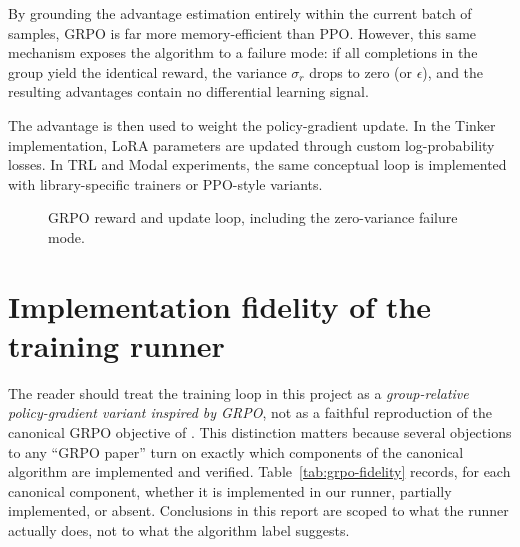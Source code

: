 \documentclass[12pt,a4paper]{report}
\newcommand{\fitdiagram}[1]{\resizebox{\textwidth}{!}{}}
\begin{document}
By grounding the advantage estimation entirely within the current batch of samples, GRPO is far more memory-efficient than PPO. However, this same mechanism exposes the algorithm to a failure mode: if all completions in the group yield the identical reward, the variance $\sigma_r$ drops to zero (or $\epsilon$), and the resulting advantages contain no differential learning signal.

The advantage is then used to weight the policy-gradient update. In the Tinker implementation, LoRA parameters are updated through custom log-probability losses. In TRL and Modal experiments, the same conceptual loop is implemented with library-specific trainers or PPO-style variants.

\begin{figure}[ht]
  \centering
  \fitdiagram{../../../platform_tinker/reports/final/tikz/grpo_loop.tex}
  \caption{GRPO reward and update loop, including the zero-variance failure mode.}
  \label{fig:grpo-loop}
\end{figure}

\section{Implementation fidelity of the training runner}
\label{sec:grpo-fidelity}

The reader should treat the training loop in this project as a \emph{group-relative policy-gradient variant inspired by GRPO}, not as a faithful reproduction of the canonical GRPO objective of \citet{shao2024deepseekmath}. This distinction matters because several objections to any ``GRPO paper'' turn on exactly which components of the canonical algorithm are implemented and verified. Table~\ref{tab:grpo-fidelity} records, for each canonical component, whether it is implemented in our runner, partially implemented, or absent. Conclusions in this report are scoped to what the runner actually does, not to what the algorithm label suggests.
\end{document}
